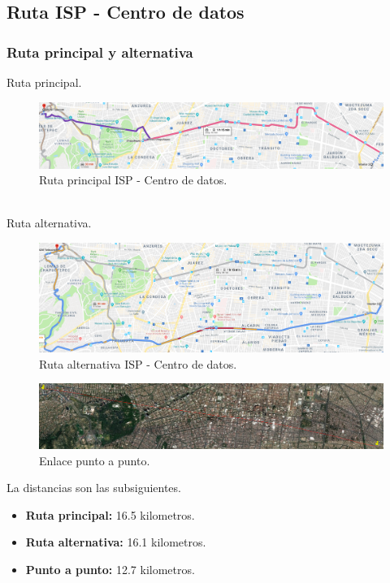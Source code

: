 \documentclass[12pt,letterpaper]{article}
\begin{document}
\newpage
\subsection{Ruta ISP - Centro de datos}
\subsubsection{Ruta principal y alternativa}
Ruta principal.
\begin{figure}[ht]
    \centering
    \includegraphics[width=1\textwidth]{imagenes/f22.png}
    \caption{Ruta principal ISP - Centro de datos.}
\end{figure}
\\
Ruta alternativa.
\begin{figure}[ht]
    \centering
    \includegraphics[width=1\textwidth]{imagenes/f23.png}
    \caption{Ruta alternativa ISP - Centro de datos.}
\end{figure}

\newpage
\begin{figure}[ht]
    \centering
    \includegraphics[width=.9\textwidth, angle=90]{imagenes/puntopunto2.png}
    \caption{Enlace punto a punto.}
\end{figure}

La distancias son las subsiguientes.
\begin{itemize}
    \item \textbf{Ruta principal: } 16.5 kilometros.
    \item \textbf{Ruta alternativa: } 16.1 kilometros.
    \item \textbf{Punto a punto: } 12.7 kilometros.
\end{itemize}
\end{document}

